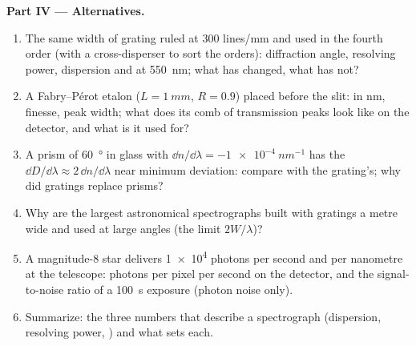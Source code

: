 \begin{problem}
\medskip
\noindent\textbf{Part IV --- Alternatives.}
\begin{enumerate}[resume]
  \item The same width of grating ruled at $300$ lines/mm and used in
        the fourth order (with a cross-disperser to sort the orders):
        diffraction angle, resolving power, dispersion and  at \qty{550}{nm}; what has changed, what has not?
  \item A Fabry--Pérot etalon ($L = \qty{1}{mm}$, $R = 0.9$) placed before
        the slit:  in nm, finesse, peak width; what
        does its comb of transmission peaks look like on the detector,
        and what is it used for?
  \item A prism of \qty{60}{\degree} in glass with $\dd n/\dd\lambda = \qty{-1e-4}{nm^{-1}}$
        has the  $\dd D/\dd\lambda \approx 2\,\dd n/\dd\lambda$ near
        minimum deviation: compare with the grating's; why did gratings
        replace prisms?
  \item Why are the largest astronomical spectrographs built with
        gratings a metre wide and used at large angles (the limit
        $2W/\lambda$)?
  \item A magnitude-8 star delivers \qty{1e4}{} photons per second and
        per nanometre at the telescope: photons per pixel per second
        on the detector, and the signal-to-noise ratio of a \qty{100}{s}
        exposure (photon noise only).
  \item Summarize: the three numbers that describe a spectrograph
        (dispersion, resolving power, ) and what
        sets each.
\end{enumerate}
\end{problem}
